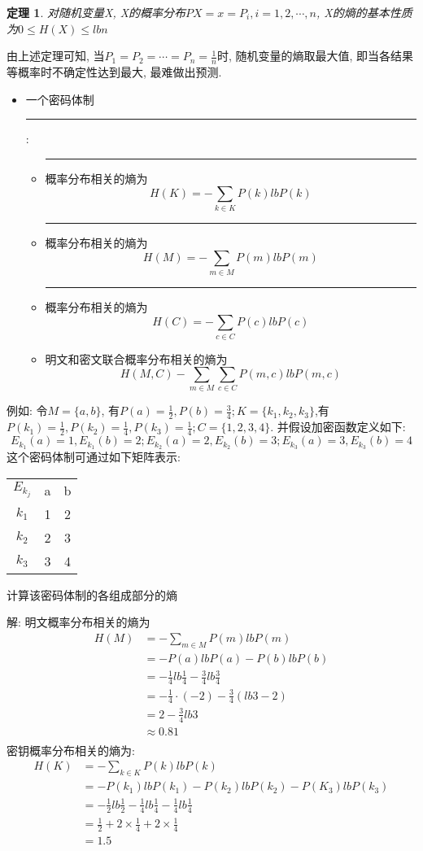 \documentclass[UTF8]{ctexart}
\newcommand\hl{\bgroup\markoverwith
  {\textcolor{yellow}{\rule[-.5ex]{2pt}{2.5ex}}}\ULon}
\newtheorem{theorem}{\hspace{2em}定理}[section]
\begin{document}
\begin{theorem}
  对随机变量X, X的概率分布$P{X=x}=P_i, i=1,2,\cdots, n$, X的熵的基本性质为$0\le H(X)\le lbn$
\end{theorem}

由上述定理可知, 当$P_1=P_2=\cdots =P_n=\frac{1}{n}$时, 随机变量的熵取最大值, 即当各结果等概率时不确定性达到最大, 最难做出预测.
\begin{itemize}
  \renewcommand{\labelitemi}{\scriptsize$\blacksquare$}
  \item 一个密码体制\hl{各个组成部分的熵}:
  \begin{itemize}
    \item \hl{密钥}概率分布相关的熵为
    $$H(K)=-\sum\limits_{k\in K} P(k)lbP(k)$$
    \item \hl{明文}概率分布相关的熵为
    $$H(M)=-\sum\limits_{m\in M} P(m)lbP(m)$$
    \item \hl{密文}概率分布相关的熵为
    $$H(C)=-\sum\limits_{c\in C} P(c)lbP(c)$$
    \item 明文和密文联合概率分布相关的熵为
    $$H(M,C)-\sum\limits_{m\in M}\sum\limits_{c\in C}P(m,c)lbP(m,c)$$
  \end{itemize}
\end{itemize}

例如: 令$M=\{a,b\}$, 有$P(a)=\frac{1}{2}, P(b)=\frac{3}{4}; K=\{k_1, k_2, k_3\}$,有$P(k_1)=\frac{1}{2}, P(k_2)=\frac{1}{4}, P(k_3)=\frac{1}{4}; C=\{1,2,3,4\}$. 并假设加密函数定义如下:
$$E_{k_1}(a)=1, E_{k_1}(b)=2; E_{k_2}(a)=2, E_{k_2}(b)=3; E_{k_3}(a)=3, E_{k_3}(b)=4$$
这个密码体制可通过如下矩阵表示:
\begin{tabular}{|c|c|c|}
  $E_{k_j}$ &a &b\\
  $k_1$ &1 &2\\
  $k_2$ &2 &3\\
  $k_3$ &3 &4\\
\end{tabular}
计算该密码体制的各组成部分的熵

解: 明文概率分布相关的熵为
$$
\begin{aligned}
  H(M)&=-\sum\limits_{m\in M}P(m)lbP(m)\\
      &=-P(a)lbP(a)-P(b)lbP(b)\\
      &=-\frac{1}{4}lb\frac{1}{4}-\frac{3}{4}lb\frac{3}{4}\\
      &=-\frac{1}{4}\cdot (-2)-\frac{3}{4}(lb3-2)\\
      &=2-\frac{3}{4}lb3\\
      &\approx 0.81\\
\end{aligned}
$$
密钥概率分布相关的熵为:
$$
\begin{aligned}
  H(K)&=-\sum\limits_{k\in K}P(k)lbP(k)\\
      &=-P(k_1)lbP(k_1)-P(k_2)lbP(k_2)-P(K_3)lbP(k_3)\\
      &=-\frac{1}{2}lb\frac{1}{2}-\frac{1}{4}lb\frac{1}{4}-\frac{1}{4}lb\frac{1}{4}\\
      &=\frac{1}{2}+2\times \frac{1}{4}+2\times \frac{1}{4}\\
      &=1.5\\
\end{aligned}
$$
\end{document}
